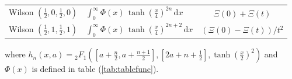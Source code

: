 \documentclass[a4paper,11pt,twoside]{amsart}
\begin{document}
{\begin{minipage}{\textwidth}
\begin{table}[H]
\begin{center}
\begin{tabular}{l|l|c|}
      Wilson $\left(\frac12,0,\frac12,0\right)$ & $\displaystyle \int_{0}^\infty \Phi(x)\,\tanh\left(\frac{x}{4}\right)^{2n}\, \mathrm{d}x $  &$\Xi(0) + \Xi(t)$ \\    
      Wilson $\left(\frac12,1,\frac12,1\right)$ & $\displaystyle \int_{0}^\infty \Phi(x)\,\tanh\left(\frac{x}{4}\right)^{2n+2}\, \mathrm{d}x $  &$\left(\Xi(0)-\Xi(t)\right)/t^2 $ \\          
    \end{tabular}
  \end{center}
\end{table}

where $\displaystyle h_n(x,a) = {}_2F_1\left(\left[a+\frac{n}{2}, a+\frac{n+1}{2}\right],\left[2a+n+\frac12\right],\tanh\left(\frac{x}{2}\right)^2\right)$ and $\Phi(x)$ is defined in table (\ref{tab:tablefunc}).
\end{minipage}}
\end{document}
